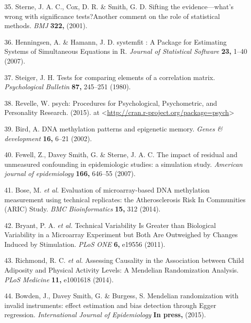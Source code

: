 \documentclass[]{article}
\begin{document}
\hypertarget{ref-Sterne2001}{}
35. Sterne, J. A. C., Cox, D. R. \& Smith, G. D. Sifting the
evidence---what's wrong with significance tests?Another comment on the
role of statistical methods. \emph{BMJ} \textbf{322,} (2001).

\hypertarget{ref-Henningsen2007}{}
36. Henningsen, A. \& Hamann, J. D. systemfit : A Package for Estimating
Systems of Simultaneous Equations in R. \emph{Journal of Statistical
Software} \textbf{23,} 1--40 (2007).

\hypertarget{ref-Steiger1980}{}
37. Steiger, J. H. Tests for comparing elements of a correlation matrix.
\emph{Psychological Bulletin} \textbf{87,} 245--251 (1980).

\hypertarget{ref-Revelle2015}{}
38. Revelle, W. psych: Procedures for Psychological, Psychometric, and
Personality Research. (2015). at
\textless{}\url{http://cran.r-project.org/package=psych}\textgreater{}

\hypertarget{ref-Bird2002}{}
39. Bird, A. DNA methylation patterns and epigenetic memory. \emph{Genes
\& development} \textbf{16,} 6--21 (2002).

\hypertarget{ref-Fewell2007}{}
40. Fewell, Z., Davey Smith, G. \& Sterne, J. A. C. The impact of
residual and unmeasured confounding in epidemiologic studies: a
simulation study. \emph{American journal of epidemiology} \textbf{166,}
646--55 (2007).

\hypertarget{ref-Bose2014}{}
41. Bose, M. \emph{et al.} Evaluation of microarray-based DNA
methylation measurement using technical replicates: the Atherosclerosis
Risk In Communities (ARIC) Study. \emph{BMC Bioinformatics} \textbf{15,}
312 (2014).

\hypertarget{ref-Bryant2011}{}
42. Bryant, P. A. \emph{et al.} Technical Variability Is Greater than
Biological Variability in a Microarray Experiment but Both Are
Outweighed by Changes Induced by Stimulation. \emph{PLoS ONE}
\textbf{6,} e19556 (2011).

\hypertarget{ref-Richmond2014}{}
43. Richmond, R. C. \emph{et al.} Assessing Causality in the Association
between Child Adiposity and Physical Activity Levels: A Mendelian
Randomization Analysis. \emph{PLoS Medicine} \textbf{11,} e1001618
(2014).

\hypertarget{ref-Bowden2015}{}
44. Bowden, J., Davey Smith, G. \& Burgess, S. Mendelian randomization
with invalid instruments: effect estimation and bias detection through
Egger regression. \emph{International Journal of Epidemiology}
\textbf{In press,} (2015).
\end{document}
